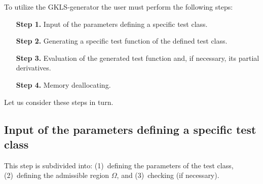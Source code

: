 \documentclass[acmtoms]{acmtrans2m}
\begin{document}
To utilize the GKLS-generator the user must perform the following
steps:
\begin{itemize}
 \item[\bf Step 1.] Input of the parameters defining a specific test class.
 \item[\bf Step 2.] Generating a specific test function of the defined test
 class.
 \item[\bf Step 3.] Evaluation of the generated test function and, if
 necessary, its partial derivatives.
 \item[\bf Step 4.] Memory deallocating.
\end{itemize}
Let us consider these steps in turn.

\subsection{Input of the parameters defining a specific test class}
\label{sectionInput}

This step is subdivided into: (1)~defining the parameters of the
test class, (2)~defining the admissible region $\Omega$, and
(3)~checking (if necessary).
\end{document}
